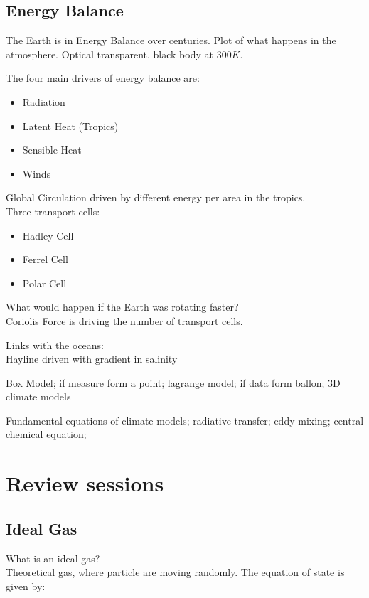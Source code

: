 \documentclass[12pt, a4paper]{article} %
\begin{document}
\subsection{Energy Balance}

The Earth is in Energy Balance over centuries. Plot of what happens in the atmosphere. Optical transparent, black body at $300K$.

The four main drivers of energy balance are:
\begin{itemize}
	\item Radiation
	\item Latent Heat (Tropics)
	\item Sensible Heat
	\item Winds
\end{itemize}

Global Circulation driven by different energy per area in the tropics. \\

Three transport cells:
\begin{itemize}
	\item Hadley Cell
	\item Ferrel Cell
	\item Polar Cell
\end{itemize}
What would happen if the Earth was rotating faster? \\

Coriolis Force is driving the number of transport cells.

Links with the oceans: \\

Hayline driven with gradient in salinity

Box Model; if measure form a point; lagrange model; if data form ballon; 3D climate models

Fundamental equations of climate models; radiative transfer; eddy mixing; central chemical equation;



\section{Review sessions}

\subsection{Ideal Gas}

What is an ideal gas? \\

Theoretical gas, where particle are moving randomly. The equation of state is given by:
\end{document}
